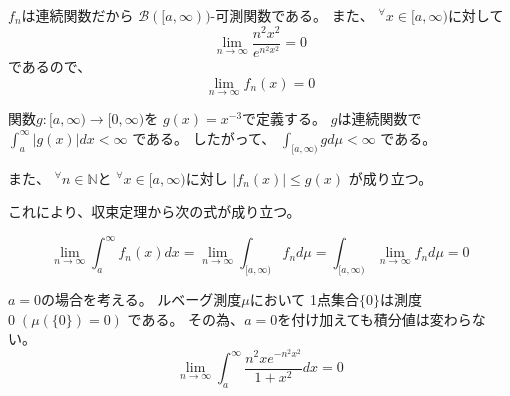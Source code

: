 \documentclass[12pt,b5paper]{ltjsarticle}
\begin{document}
\begin{enumerate}
      $f_{n}$は連続関数だから
      $\mathcal{B}([a,\infty))$-可測関数である。
      また、
      ${}^{\forall}x\in [a,\infty)$に対して
      \begin{equation}
       \lim_{n\to \infty} \frac{n^2x^2}{e^{n^2x^2}}
        =0
      \end{equation}
      であるので、
      \begin{equation}
       \lim_{n\to\infty}f_{n}(x) =0
      \end{equation}


      関数$g:[a,\infty)\to[0,\infty)$を
      $g(x)=x^{-3}$で定義する。
      $g$は連続関数で
      $\int_{a}^{\infty}\lvert g(x) \rvert dx <\infty$
      である。
      したがって、
      $\int_{[a,\infty)} g  d\mu < \infty$
      である。

      また、
      ${}^{\forall} n\in\mathbb{N}$と
      ${}^{\forall}x\in[a,\infty)$に対し
      $\lvert f_{n}(x) \rvert \leq g(x)$
      が成り立つ。

      これにより、収束定理から次の式が成り立つ。

      \begin{equation}
       \lim_{n\to\infty} \int_{a}^{\infty}f_{n}(x)dx
        = \lim_{n\to\infty} \int_{[a,\infty)}f_{n} d\mu
        = \int_{[a,\infty)} \lim_{n\to\infty} f_{n} d\mu
        =0
      \end{equation}


      $a=0$の場合を考える。
      ルベーグ測度$\mu$において
      1点集合$\{0\}$は測度$0 \;(\mu(\{0\}) = 0)$
      である。
      その為、$a=0$を付け加えても積分値は変わらない。
      \begin{equation}
       \lim_{n\to\infty}
        \int_{a}^{\infty} \frac{n^{2} x e^{-n^{2}x^{2}}}{1+x^{2}}dx
        =0
      \end{equation}
      


      \hrulefill

\end{enumerate}

\hrulefill
\end{document}

